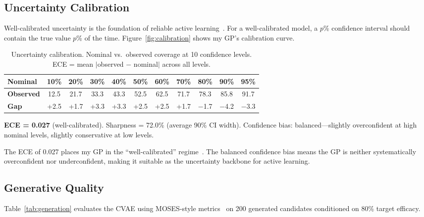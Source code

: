 \documentclass{article}
\begin{document}
\subsection{Uncertainty Calibration}

Well-calibrated uncertainty is the foundation of reliable active learning~\citep{kuleshov2018}. For a well-calibrated model, a $p$\% confidence interval should contain the true value $p$\% of the time. Figure~\ref{fig:calibration} shows my GP's calibration curve.

\begin{table}[t]
\caption{Uncertainty calibration. Nominal vs.\ observed coverage at 10 confidence levels. ECE = mean $|$observed $-$ nominal$|$ across all levels.}
\label{tab:calibration}
\centering
\small
\begin{tabular}{@{}lcccccccccc@{}}
\toprule
\textbf{Nominal} & 10\% & 20\% & 30\% & 40\% & 50\% & 60\% & 70\% & 80\% & 90\% & 95\% \\
\midrule
\textbf{Observed} & 12.5 & 21.7 & 33.3 & 43.3 & 52.5 & 62.5 & 71.7 & 78.3 & 85.8 & 91.7 \\
\textbf{Gap} & +2.5 & +1.7 & +3.3 & +3.3 & +2.5 & +2.5 & +1.7 & $-$1.7 & $-$4.2 & $-$3.3 \\
\bottomrule
\end{tabular}
\vspace{0.3em}

\noindent\textbf{ECE = 0.027} (well-calibrated). Sharpness = 72.0\% (average 90\% CI width). Confidence bias: balanced---slightly overconfident at high nominal levels, slightly conservative at low levels.
\end{table}

The ECE of 0.027 places my GP in the ``well-calibrated'' regime~\citep{naeini2015}. The balanced confidence bias means the GP is neither systematically overconfident nor underconfident, making it suitable as the uncertainty backbone for active learning.

\subsection{Generative Quality}

Table~\ref{tab:generation} evaluates the CVAE using MOSES-style metrics~\citep{moses2020} on 200 generated candidates conditioned on 80\% target efficacy.
\end{document}
